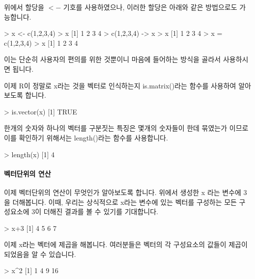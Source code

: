 \documentclass{book}
\begin{document}
위에서 할당을 $<-$ 기호를 사용하였으나, 이러한 할당은 아래와 같은 방법으로도 가능합니다. 

\begin{Schunk}
	\begin{Soutput}
> x <- c(1,2,3,4)
> x
[1] 1 2 3 4
> c(1,2,3,4) -> x
> x
[1] 1 2 3 4
> x = c(1,2,3,4)		
> x
[1] 1 2 3 4
\end{Soutput}
\end{Schunk}

이는 단순히 사용자의 편의를 위한 것뿐이니 마음에 들어하는 방식을 골라서 사용하시면 됩니다. 

이제 R이 정말로 x라는 것을 벡터로 인식하는지 is.matrix()라는 함수를 사용하여 알아보도록 합니다. 

\begin{Schunk}
\begin{Soutput}
> is.vector(x)
[1] TRUE
\end{Soutput}
\end{Schunk}

한개의 숫자와 하나의 벡터를 구분짓는 특징은 몇개의 숫자들이 한데 묶였는가 이므로 이를 확인하기 위해서는 length()라는 함수를 사용합니다. 

\begin{Schunk}
\begin{Soutput}
> length(x)
[1] 4
\end{Soutput}
\end{Schunk}

\paragraph{벡터단위의 연산}  이제 벡터단위의 연산이 무엇인가 알아보도록 합니다. 
위에서 생성한 x 라는 변수에 3 을 더해봅니다. 
이때, 우리는 상식적으로 x라는 변수에 있는 벡터를 구성하는 모든 구성요소에 3이 더해진 결과를 볼 수 있기를 기대합니다. 

\begin{Schunk}
\begin{Soutput}
> x+3
[1] 4 5 6 7	
\end{Soutput}
\end{Schunk}

이제 x라는 벡터에 제곱을 해봅니다. 
여러분들은 벡터의 각 구성요소의 값들이 제곱이 되었음을 알 수 있습니다. 
\begin{Schunk}
\begin{Soutput}
> x^2
[1]  1  4  9 16
\end{Soutput}
\end{Schunk}
\end{document}
